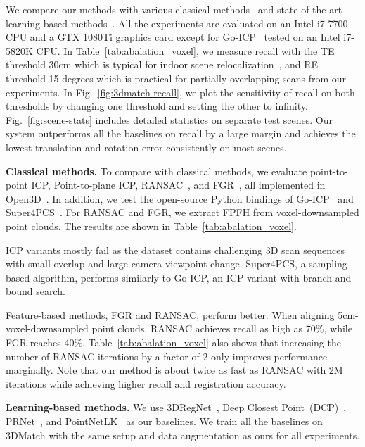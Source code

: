 \documentclass[10pt,twocolumn,letterpaper]{article}
\begin{document}
We compare our methods with various classical methods~\cite{zhou2016eccv,rusu2009icra,yang2015go} and state-of-the-art learning based methods~\cite{wang2019deep,wang2019nips,aoki2019pointnetlk,dias2019corr}. 
All the experiments are evaluated on an Intel i7-7700
CPU and a GTX 1080Ti graphics card except for Go-ICP~\cite{yang2015go} tested on an Intel i7-5820K
CPU.
In Table~\ref{tab:abalation_voxel}, we measure recall with the TE threshold 30cm which is typical for indoor scene relocalization~\cite{murTRO2015}, and RE threshold 15 degrees which is practical for partially overlapping scans from our experiments. In Fig.~\ref{fig:3dmatch-recall}, we plot the sensitivity of recall on both thresholds by changing one threshold and setting the other to infinity. Fig.~\ref{fig:scene-stats} includes detailed statistics on separate test scenes. Our system outperforms all the baselines on recall by a large margin and achieves the lowest translation and rotation error consistently on most scenes.


\noindent \textbf{Classical methods.}
To compare with classical methods, we evaluate point-to-point ICP, Point-to-plane ICP, RANSAC~\cite{rusu2009icra}, and FGR~\cite{zhou2016eccv}, all implemented in Open3D~\cite{Zhou2018}. In addition, we test the open-source Python bindings of Go-ICP~\cite{yang2015go} and Super4PCS~\cite{mellado2014super}.
For RANSAC and FGR, we extract FPFH from voxel-downsampled point clouds.
The results are shown in Table~\ref{tab:abalation_voxel}.

ICP variants mostly fail as the dataset contains challenging 3D scan sequences with small overlap and large camera viewpoint change.
Super4PCS, a sampling-based algorithm, performs similarly to Go-ICP, an ICP variant with branch-and-bound search.

Feature-based methods, FGR and RANSAC, perform better. When aligning 5cm-voxel-downsampled point clouds, RANSAC achieves recall as high as 70\%, while FGR reaches 40\%.
Table~\ref{tab:abalation_voxel} also shows that increasing the number of RANSAC iterations by a factor of 2 only improves performance marginally.
Note that our method is about twice as fast as RANSAC with 2M iterations while achieving higher recall and registration accuracy.





\noindent \textbf{Learning-based methods.}
We use 3DRegNet~\cite{dias2019corr}, Deep Closest Point~(DCP)~\cite{wang2019deep}, PRNet~\cite{wang2019nips}, and PointNetLK~\cite{aoki2019pointnetlk} as our baselines. We train all the baselines on 3DMatch with the same setup and data augmentation as ours for all experiments.
\end{document}
